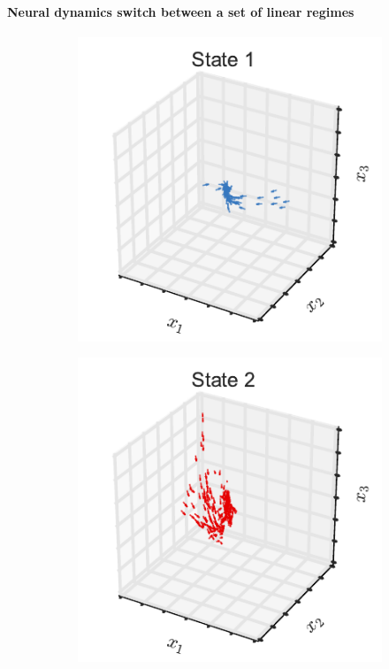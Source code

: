 \documentclass{article}
\begin{document}
\paragraph{Neural dynamics switch between a set of linear regimes}
\begin{figure}[th!]
  \centering%
  \begin{subfigure}[b]{0.32\linewidth}
    \includegraphics[width=\textwidth]{dynamics_3d_0.pdf}
  \end{subfigure}
  \begin{subfigure}[b]{0.32\linewidth}
    \includegraphics[width=\textwidth]{dynamics_3d_1.pdf}

\end{subfigure}
\end{figure}
\end{document}
